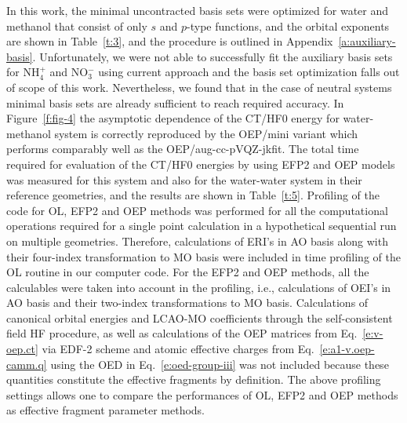 In this work, the minimal uncontracted basis sets were optimized for water and methanol
that consist of only $s$ and $p$\hyp{}type functions,
and the orbital exponents are shown in Table~\ref{t:3},
and the procedure is outlined in Appendix~\ref{a:auxiliary-basis}.
Unfortunately, we were not able to successfully fit the auxiliary basis sets
for NH$_4^+$ and NO$_3^-$ using current approach
and the basis set optimization falls out of scope of this work.
Nevertheless, we found that in the case of neutral systems minimal basis
sets are already sufficient to reach required accuracy.
In Figure~\ref{f:fig-4} the asymptotic dependence of the CT/HF0 energy
for water\hyp{}methanol system is correctly reproduced by the OEP/mini variant
which
performs comparably well as the OEP/aug-cc-pVQZ-jkfit. 
The total time required for evaluation of the CT/HF0 energies by using EFP2 and OEP
models was measured for this system and also for the water-water system in their reference geometries,
and the results are shown in Table~\ref{t:5}. 
Profiling of the code for OL, EFP2 and OEP methods was performed 
for all the computational operations required for a
single point calculation in a hypothetical sequential run on multiple
geometries. Therefore, calculations of ERI's in AO basis 
along with their four\hyp{}index transformation to MO basis were included in
time profiling of the OL routine in our computer code. For the EFP2 
and OEP methods, all the calculables were taken into account in the profiling,
i.e., calculations of OEI's in AO basis and their two\hyp{}index transformations
to MO basis. Calculations of canonical orbital 
energies and LCAO\hyp{}MO coefficients through the self\hyp{}consistent field
HF procedure, as well as calculations of the
OEP matrices from Eq.~\eqref{e:v-oep.ct} 
via EDF-2 scheme and atomic effective charges from Eq.~\eqref{e:a1-v.oep-camm.q}
using the OED in Eq.~\eqref{e:oed-group-iii}
was not included because these quantities constitute the effective fragments
by definition.
The above profiling settings allows one to compare the performances
of OL, EFP2 and OEP methods as effective fragment parameter methods.

